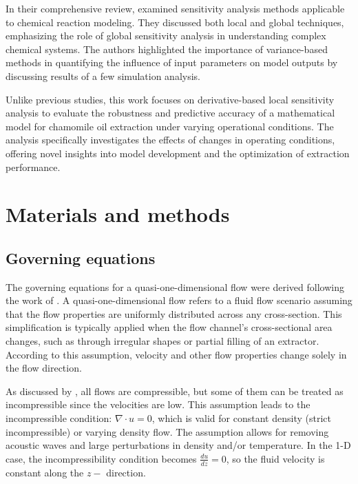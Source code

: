 \documentclass[a4paper,fleqn]{cas-dc}
\begin{document}
	In their comprehensive review, \citet{Saltelli2005} examined sensitivity analysis methods applicable to chemical reaction modeling. They discussed both local and global techniques, emphasizing the role of global sensitivity analysis in understanding complex chemical systems. The authors highlighted the importance of variance-based methods in quantifying the influence of input parameters on model outputs by discussing results of a few simulation analysis.
		
	Unlike previous studies, this work focuses on derivative-based local sensitivity analysis to evaluate the robustness and predictive accuracy of a mathematical model for chamomile oil extraction under varying operational conditions. The analysis specifically investigates the effects of changes in operating conditions, offering novel insights into model development and the optimization of extraction performance.
	
	
	\section{Materials and methods} \label{CH: Materials and methods}
	
	\subsection{Governing equations} \label{CH:Governing_equations_chapter}
	The governing equations for a quasi-one-dimensional flow were derived following the work of \citet{Anderson1995}. A quasi-one-dimensional flow refers to a fluid flow scenario assuming that the flow properties are uniformly distributed across any cross-section. This simplification is typically applied when the flow channel's cross-sectional area changes, such as through irregular shapes or partial filling of an extractor. According to this assumption, velocity and other flow properties change solely in the flow direction.
	
	As discussed by \citet{Anderson2023}, all flows are compressible, but some of them can be treated as incompressible since the velocities are low. This assumption leads to the incompressible condition: $\nabla \cdot u =0$, which is valid for constant density (strict incompressible) or varying density flow. The assumption allows for removing acoustic waves and large perturbations in density and/or temperature. In the 1-D case, the incompressibility condition becomes $\frac{du}{dz} = 0$, so the fluid velocity is constant along the $z-$ direction.
	
\end{document}
